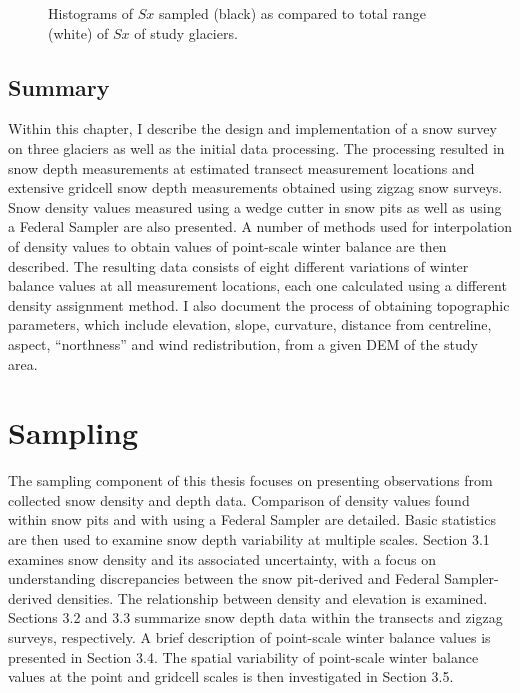 \documentclass{sfuthesis}
\begin{document}
\begin{figure}
	\caption{Histograms of $Sx$ sampled (black) as compared to total range (white) of $Sx$ of study glaciers.}
	\label{sampledRange:Sx}
\end{figure}


\section{Summary}

Within this chapter, I describe the design and implementation of a snow survey on three glaciers as well as the initial data processing. The processing resulted in snow depth measurements at estimated transect measurement locations and extensive gridcell snow depth measurements obtained using zigzag snow surveys. Snow density values measured using a wedge cutter in snow pits as well as using a Federal Sampler are also presented. A number of methods used for interpolation of density values to obtain values of point-scale winter balance are then described. The resulting data consists of eight different variations of winter balance values at all measurement locations, each one calculated using a different density assignment method. I also document the process of obtaining topographic parameters, which include elevation, slope, curvature, distance from centreline, aspect, ``northness'' and wind redistribution, from a given DEM of the study area.




\chapter{Sampling}

The sampling component of this thesis focuses on presenting observations from collected snow density and depth data. Comparison of density values found within snow pits and with using a Federal Sampler are detailed. Basic statistics are then used to examine snow depth variability at multiple scales.  Section 3.1 examines snow density and its associated uncertainty, with a focus on understanding discrepancies between the snow pit-derived and Federal Sampler-derived densities. The relationship between density and elevation is examined. Sections 3.2 and 3.3 summarize snow depth data within the transects and zigzag surveys, respectively. A brief description of point-scale winter balance values is presented in Section 3.4. The spatial variability of point-scale winter balance values at the point and gridcell scales is then investigated in Section 3.5.
\end{document}
